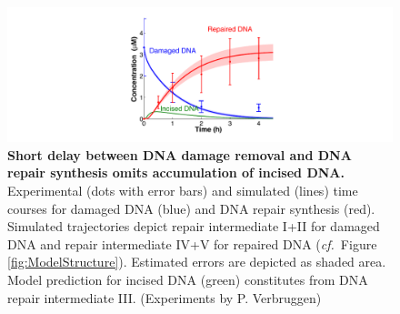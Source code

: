 \begin{figure}[htbp]
	\begin{center}
		\includegraphics[width=1\textwidth]{Abbildungen/figure2_7.pdf}
		\caption{\textbf{Short delay between DNA damage removal and DNA repair synthesis omits accumulation of incised DNA.} Experimental (dots with error bars) and simulated (lines) time courses for damaged DNA (blue) and DNA repair synthesis (red). Simulated trajectories depict repair intermediate I+II for damaged DNA and repair intermediate IV+V for repaired DNA (\textit{cf.}\ Figure \ref{fig:ModelStructure}). Estimated errors are depicted as shaded area. Model prediction for incised DNA (green) constitutes from DNA repair intermediate III. (Experiments by P. Verbruggen)}
		\label{fig:ModelFit_intermed}
	\end{center}
\end{figure}

